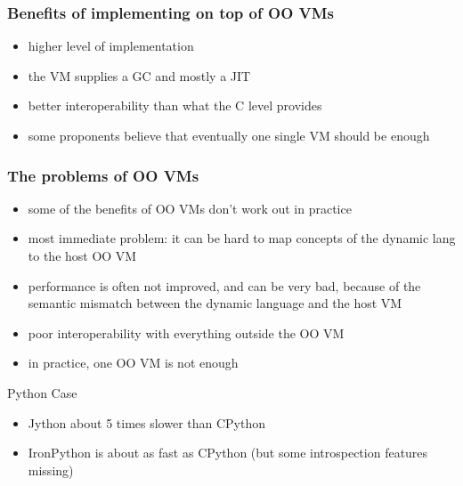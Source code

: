 \documentclass[utf8x]{beamer}
\begin{document}
\begin{frame}
  \frametitle{Benefits of implementing on top of OO VMs}
  \begin{itemize}
  \item
    higher level of implementation
  \item
    the VM supplies a GC and mostly a JIT
  \item
    better interoperability than what the C level provides
  \item
    some proponents believe that eventually one single VM should be enough
  \end{itemize}
\end{frame}

\begin{frame}
  \frametitle{The problems of OO VMs}
  \begin{itemize}
  \item
    some of the benefits of OO VMs don't work out in practice
  \item
    most immediate problem: it can be hard to map
    concepts of the dynamic lang to
    the host OO VM
  \item
    performance is often not improved, and can be very bad, because of the
    semantic mismatch between the dynamic language and the host VM
  \item
    poor interoperability with everything outside the OO VM
  \item
    in practice, one OO VM is not enough
  \end{itemize}
  \pause
  \begin{block}{
    Python Case}
    \begin{itemize}
    \item
      Jython about 5 times slower than CPython
    \item
      IronPython is about as fast as CPython (but some introspection features
      missing)
    \end{itemize}
  \end{block}
 
\end{frame}
\end{document}
